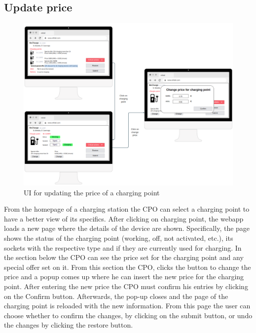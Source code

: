 \subsection{Update price}
\begin{figure}[H]
    \centering
    \includegraphics[width=1\textwidth]{Images/cp3/updatePrice.png}
    \caption{UI for updating the price of a charging point}
\end{figure}
From the homepage of a charging station the CPO can select a charging point to have a better view of its specifics. After clicking on charging point, the webapp loads a new page where the details of the device are shown. Specifically, the page shows the status of the charging point (working, off, not activated, etc.), its sockets with the respective type and if they are currently used for charging. In the section below the CPO can see the price set for the charging point and any special offer set on it. From this section the CPO, clicks the button to change the price and a popup comes up where he can insert the new price for the charging point. After entering the new price the CPO must confirm his entries by clicking on the Confirm button. Afterwards, the pop-up closes and the page of the charging point is reloaded with the new information. From this page the user can choose whether to confirm the changes, by clicking on the submit button, or undo the changes by clicking the restore button.

